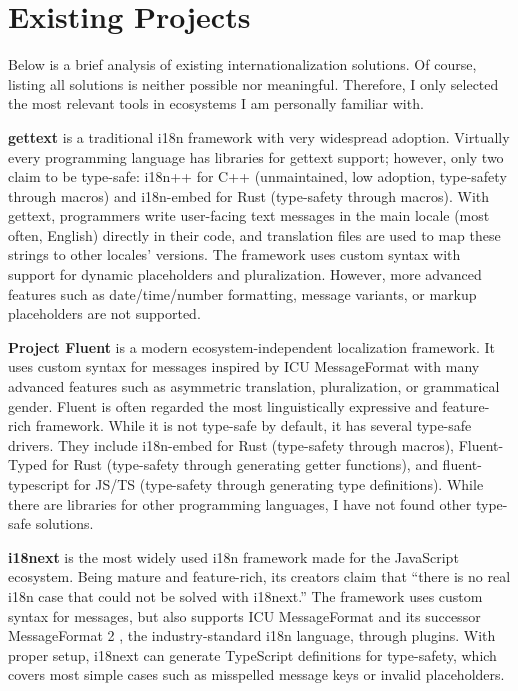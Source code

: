 \section{Existing Projects}

Below is a brief analysis of existing internationalization solutions.
Of course, listing all solutions is neither possible nor meaningful.
Therefore, I only selected the most relevant tools in ecosystems I am
personally familiar with.

\textbf{gettext} \cite{gettext} is a traditional i18n framework with
very widespread adoption. Virtually every programming language has
libraries for gettext support; however, only two claim to be type-safe:
i18n++ for C++ \cite{i18n-cpp} (unmaintained, low adoption,
type-safety through macros) and i18n-embed for Rust \cite{i18n-embed}
(type-safety through macros). With gettext, programmers write
user-facing text messages in the main locale (most often, English)
directly in their code, and translation files are used to map these
strings to other locales' versions. The framework uses custom syntax
with support for dynamic placeholders and pluralization. However,
more advanced features such as date/time/number formatting, message
variants, or markup placeholders are not supported.

\textbf{Project Fluent} \cite{fluent} is a modern
ecosystem-independent localization framework. It uses custom syntax
for messages inspired by ICU MessageFormat \cite{icumf} with many
advanced features such as asymmetric translation, pluralization, or
grammatical gender. Fluent is often regarded the most linguistically
expressive and feature-rich framework. While it is not type-safe by
default, it has several type-safe drivers. They include i18n-embed
for Rust \cite{i18n-embed} (type-safety through macros), Fluent-Typed
for Rust \cite{fluent-typed} (type-safety through generating getter
functions), and fluent-typescript for JS/TS \cite{fluent-typescript}
(type-safety through generating type definitions). While there are
libraries for other programming languages, I have not found other
type-safe solutions.

\textbf{i18next} \cite{i18next} is the most widely used i18n
framework made for the JavaScript ecosystem. Being mature and
feature-rich, its creators claim that \enquote{there is no real i18n
case that could not be solved with i18next.} The framework uses
custom syntax for messages, but also supports ICU MessageFormat
\cite{icumf1} and its successor MessageFormat 2 \cite{icumf2}, the
industry-standard i18n language, through plugins. With proper setup,
i18next can generate TypeScript definitions for type-safety, which
covers most simple cases such as misspelled message keys or invalid
placeholders.

